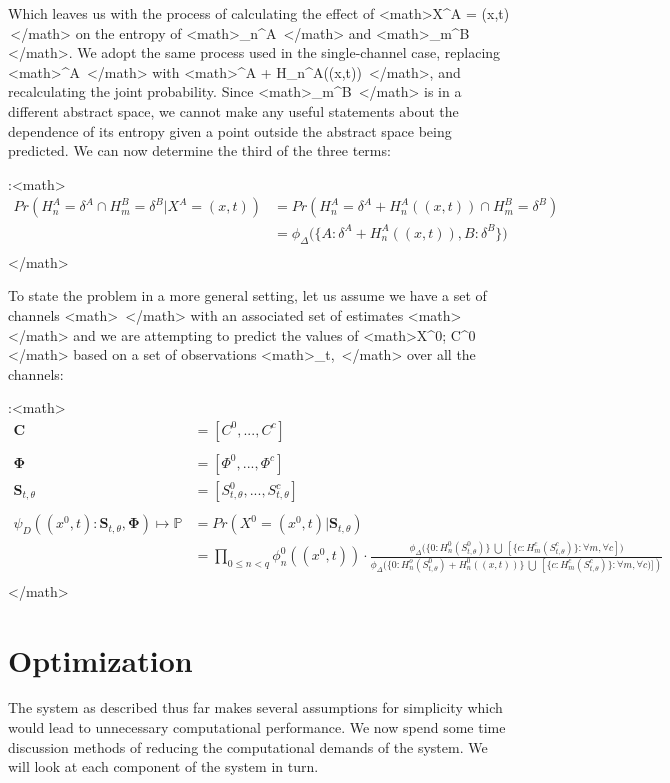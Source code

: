 \documentclass[11pt,twocolumn,titlepage]{article}
\begin{document}
Which leaves us with the process of calculating the effect of <math>X^A = (x,t) \,\!</math> on the entropy of <math>\phi_n^A \,\!</math> and <math>\phi_m^B \,\!</math>.  We adopt the same process used in the single-channel case, replacing <math>\delta^A \,\!</math> with <math>\delta^A + H_n^A((x,t)) \,\!</math>, and recalculating the joint probability. Since <math>\phi_m^B \,\!</math> is in a different abstract space, we cannot make any useful statements about the dependence of its entropy given a point outside the abstract space being predicted.  We can now determine the third of the three terms:

:<math>
\begin{align}
Pr( H_n^A = \delta^A \cap H_m^B = \delta^B | X^A = (x,t) ) &= Pr( H_n^A = \delta^A + H_n^A((x,t)) \cap H_m^B = \delta^B ) \\
&= \phi_\Delta \Big( \{ A:\delta^A + H_n^A((x,t)), B: \delta^B \} \Big) \\
\end{align}
</math>


To state the problem in a more general setting, let us assume we have a set of channels <math> \,\!</math> with an associated set of estimates <math>\mathbf{\Phi} \,\!</math> and we are attempting to predict the values of <math>X^0; C^0 \in {} \,\!</math> based on a set of observations <math>_{t,\theta} \,\!</math> over all the channels:

:<math>
\begin{align}
\mathbf{C} &= [C^0,...,C^c] \\
\\
\mathbf{\Phi} &= [\Phi^0,...,\Phi^c] \\
\mathbf{S}_{t,\theta} &= [ S_{t,\theta}^0,...,S_{t,\theta}^c] \\
\\
\psi_D((x^0,t):\mathbf{S}_{t,\theta},\mathbf{\Phi}) \mapsto \mathbb{P} &= Pr( X^0 = (x^0,t) | \mathbf{S}_{t,\theta} ) \\
&= \prod_{ 0 \le n < q} \phi_n^0((x^0,t)) \cdot \frac
{ \phi_\Delta \bigg( \Big\{ 0:H_n^0(S_{t,\theta}^0) \Big\} \ \bigcup \ \left [ \Big\{ c: H_m^c(S_{t,\theta}^c ) \Big\} : \forall m, \forall c \right ] \bigg) }
{ \phi_\Delta \bigg( \Big\{ 0: H_n^o(S_{t,\theta}^0) + H_n^0((x,t)) \Big\} \ \bigcup \ \left [ \Big\{c:H_m^c(S_{t,\theta}^c) \Big\} : \forall m, \forall c ) \bigg] \right ) }  \\
\end{align}
</math>

\section{Optimization}
The system as described thus far makes several assumptions for simplicity which would lead to unnecessary computational performance.  We now spend some time discussion methods of reducing the computational demands of the system.  We will look at each component of the system in turn.
\end{document}
